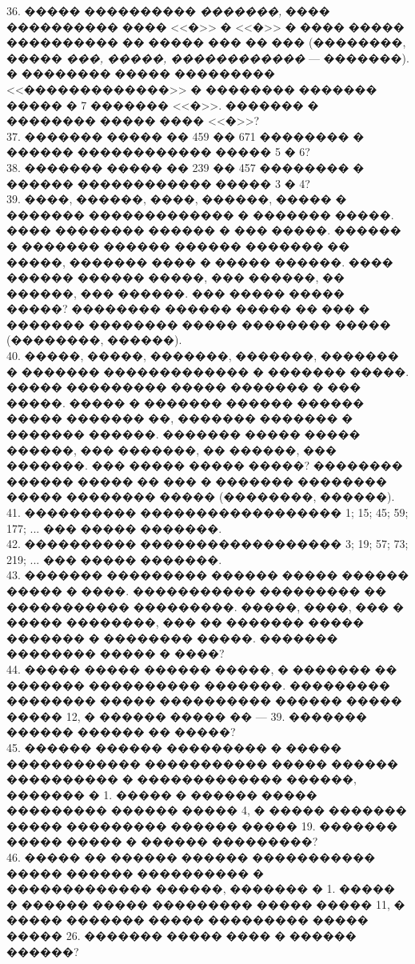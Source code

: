 \documentclass[12pt]{article}
\begin{document}
36. ����� ���������� {\it �������,} ���� ���������� ���� <<�>> � <<�>> � ���� ����� ���������� �� ����� ��� �� ��� (��������, ����� {\it ���, �����, ������������} --- �������). � �������� ����� ��������� <<�������������>> � �������� ������� ����� � 7 ������� <<�>>. ������� � �������� ����� ���� <<�>>?\\
37. ������� ����� �� 459 �� 671 �������� � ������ ������������ ����� 5 � 6?\\
38. ������� ����� �� 239 �� 457 �������� � ������ ������������ ����� 3 � 4?\\
39. ����, ������, ����, ������, ����� � ������� ������������� � ������� �����. ���� �������� ������ � ��� �����. ������ � ������� ������ ������ ������� �� �����, ������� ���� � ����� ������. ���� ������ ������ �����, ��� ������, �� ������, ��� ������. ��� ����� ����� �����? �������� ������ ����� �� ��� � ������� �������� ����� �������� ����� (��������, ������).\\
40. �����, �����, �������, �������, ������� � ������� ������������� � ������� �����. ����� ��������� ����� ������� � ��� �����. ����� � ������� ������ ������ ����� ������� ��, ������� ������� � ������� ������. ������� ����� ����� ������, ��� �������, �� ������, ��� �������. ��� ����� ����� �����? �������� ������ ����� �� ��� � ������� �������� ����� �������� ����� (��������, ������).\\
41. ���������� ������������������ 1; 15; 45; 59; 177; ... ��� ����� �������.\\
42. ���������� ������������������ 3; 19; 57; 73; 219; ... ��� ����� �������.\\
43. ������� ��������� ������ ����� ������ ����� � ����. ����������� ��������� �� ����������� ���������. �����, ����, ��� � ����� ��������, ��� �� ������� ����� ������� � �������� �����. ������� �������� ����� � ����?\\
44. ����� ����� ������ �����, � ������� �� ������� ���������� �������. ��������� �������� ����� ���������� ������ ����� ����� 12, � ������ ����� �� --- 39. ������� ������ ������ �� �����?\\
45. ������ ������ ��������� � ����� ������������ ����������� ����� ������ ���������� � ������������� ������, ������� � 1. ����� � ������ ����� ��������� ������ ����� 4, � ����� ������� ����� ��������� ������ ����� 19. ������� ����� ����� � ������ ���������?\\
46. ����� �� ������ ������ ����������� ����� ������ ���������� � ������������� ������, ������� � 1. ����� � ������ ����� ��������� ����� ����� 11, � ����� ������� ����� ��������� ����� ����� 26. ������� ����� ���� � ������ ������?\\
\end{document}
